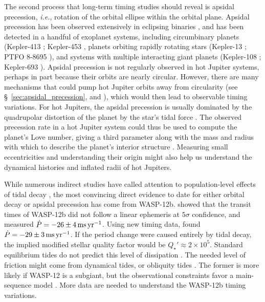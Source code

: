 \documentclass[12pt,twocolumn,tighten]{aastex62}
\begin{document}
The second process that long-term timing studies should reveal is
apsidal precession, {\it i.e.}, rotation of the orbital ellipse within
the orbital plane. Apsidal precession has been observed extensively in
eclipsing binaries \citep[{\it e.g.},][]{
  schwarzschild_structure_1958,torres_accurate_2010,borkovits_eclipse_2015},
and has been detected in a handful of exoplanet systems, including
circumbinary planets (Kepler-413 \citealt{kostov_kepler-413b_2014};
Kepler-453 \citealt{welsh_kepler_2015}, planets orbiting rapidly
rotating stars (Kepler-13
\citealt{szabo_spin-orbit_2012,szabo_mapping_2014,masuda_spin-orbit_2015};
PTFO 8-8695 \citealt{barnes_measurement_2013}), and systems with
multiple interacting giant planets (Kepler-108
\citealt{mills_kepler-108_2017}; Kepler-693
\citealt{masuda_eccentric_2017}).  Apsidal precession is not regularly
observed in hot Jupiter systems, perhaps in part because their orbits
are nearly circular.  However, there are many mechanisms that
could pump hot Jupiter orbits away from circularity (see
\S~\ref{sec:apsidal_precession}, and
\citealt{bailey_understanding_2019}), which would then lead to
observable timing variations.  For hot Jupiters, the apsidal
precession is usually dominated by the quadrupolar distortion of the
planet by the star's tidal force \citep{ragozzine_probing_2009}.  The
observed precession rate in a hot Jupiter system could thus be used to
compute the planet's Love number, giving a third parameter along with
the mass and radius with which to describe the planet's interior
structure \citep[{\it e.g.},][who performed a similar procedure for
HAT-P-13b]{batygin_determination_2009}.  Measuring small
eccentricities and understanding their origin might also help us
understand the dynamical histories and inflated radii of hot Jupiters.
\citep[{\it
e.g.},][respectively]{dawson_origins_2018,ibgui_tidal_2010}

While numerous indirect studies have called attention to
population-level effects of tidal decay
\citep{jackson_observational_2009,hansen_calibration_2010,penev_constraining_2012,husnoo_observational_2012,matsakos_origin_2016,cameron_hierarchical_2018,penev_empirical_2018},
the most convincing direct evidence to date for either orbital decay
or apsidal precession has come from WASP-12b.
\citet{maciejewski_departure_2016} showed that the transit times of
WASP-12b did not follow a linear ephemeris at $5\sigma$ confidence,
and measured $\dot{P} = -26 \pm 4\,{\rm ms}\,{\rm yr}^{-1}$.  Using
new timing data, \citet{patra_2017} found $\dot{P} = -29 \pm 3\,{\rm
ms}\,{\rm yr}^{-1}$.  If the period change were caused entirely by
tidal decay, the implied modified stellar quality factor would be
$Q_\star' \approx 2\times10^5$.  Standard equilibrium tides do not
predict this level of dissipation
\citep{penev_tidal_2011,ogilvie_tidal_2014}.  The needed level of
friction might come from dynamical tides, or obliquity tides
\citep{weinberg_tidal_2017,millholland_obliquity_2018}.  The former is
more likely if WASP-12 is a subgiant, but the observational
constraints favor a main-sequence model
\citep{bailey_understanding_2019}.  More data are needed to understand
the WASP-12b timing variations.
\end{document}
